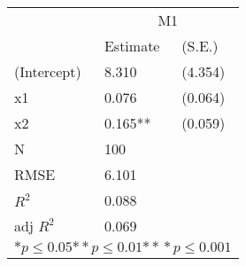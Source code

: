 \begin{tabular}{*{3}{l}}
\hline
                  & \multicolumn{2}{c}{M1}   \tabularnewline
                   &Estimate  &(S.E.)  \tabularnewline
 \hline
 \hline
   (Intercept)     &8.310   &   (4.354) \tabularnewline
   x1              &0.076   &   (0.064) \tabularnewline
   x2              &0.165**   &   (0.059) \tabularnewline
 \hline
 N                 &100       &        \tabularnewline
 RMSE             &6.101         & \tabularnewline
 $R^2$             &0.088         & \tabularnewline
 adj $R^2$         &0.069         & \tabularnewline
 \hline
\hline
 
 \multicolumn{3}{c}{${*  p}\le 0.05$${*\!\!*  p}\le 0.01$${*\!\!*\!\!*  p}\le 0.001$}\tabularnewline
 \end{tabular}
